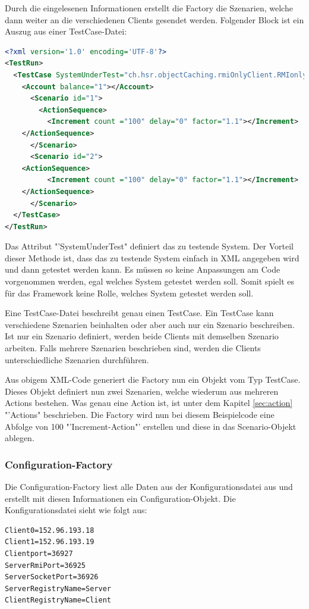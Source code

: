 Durch die ein\-ge\-lesenen In\-for\-ma\-tio\-nen er\-stellt die Fac\-tory die Szena\-rien, wel\-che dann wei\-ter an die ver\-schie\-denen Clients ge\-sendet werden. Folgender Block ist ein Auszug aus einer TestCase-Datei:

\begin{lstlisting}[language=XML, breaklines=true] 	
<?xml version='1.0' encoding='UTF-8'?>
<TestRun>
  <TestCase SystemUnderTest="ch.hsr.objectCaching.rmiOnlyClient.RMIonlyClientSystem">
    <Account balance="1"></Account>
      <Scenario id="1">
        <ActionSequence>
          <Increment count ="100" delay="0" factor="1.1"></Increment>
	</ActionSequence>
      </Scenario>
      <Scenario id="2">
	<ActionSequence>
          <Increment count ="100" delay="0" factor="1.1"></Increment>
	</ActionSequence>
      </Scenario>
  </TestCase>
</TestRun>
\end{lstlisting}

Das Attribut "'SystemUnderTest" definiert das zu testende System. Der Vorteil dieser Methode ist, dass das zu testende System einfach in XML angegeben wird und dann getestet werden kann. Es müssen so keine Anpassungen am Code vorgenommen werden, egal welches System getestet werden soll. Somit spielt es für das Framework keine Rolle, welches System getestet werden soll.

Eine TestCase-Datei beschreibt genau einen TestCase. Ein Test\-Case kann ver\-schie\-dene Sze\-na\-ri\-en be\-in\-hal\-ten oder aber auch nur ein Szena\-rio be\-schrei\-ben. Ist nur ein Sz\-enario definiert, werden beide Clients mit dem\-selben Szenario arbeiten. Falls mehrere Szenarien beschrieben sind, werden die Cli\-ents unterschiedliche Szenarien durchführen. 

Aus obigem XML-Code generiert die Factory nun ein Objekt vom Typ TestCase. Dieses Objekt definiert nun zwei Szenarien, welche wiederum aus mehreren Actions bestehen. Was genau eine Action ist, ist unter dem Kapitel \ref{sec:action} "'Actions" beschrieben. Die Factory wird nun bei diesem Beispielcode eine Abfolge von 100 "'Increment-Action"' erstellen und diese in das Scenario-Objekt ablegen.

\subsubsection{Configuration-Factory}
\label{sec:configurationFactory}
Die Configuration-Factory liest alle Daten aus der Konfigurationsdatei aus und erstellt mit diesen Informationen ein Configuration-Objekt. Die Konfigurationsdatei sieht wie folgt aus:
\begin{verbatim}
Client0=152.96.193.18
Client1=152.96.193.19
Clientport=36927
ServerRmiPort=36925
ServerSocketPort=36926
ServerRegistryName=Server
ClientRegistryName=Client
\end{verbatim}

